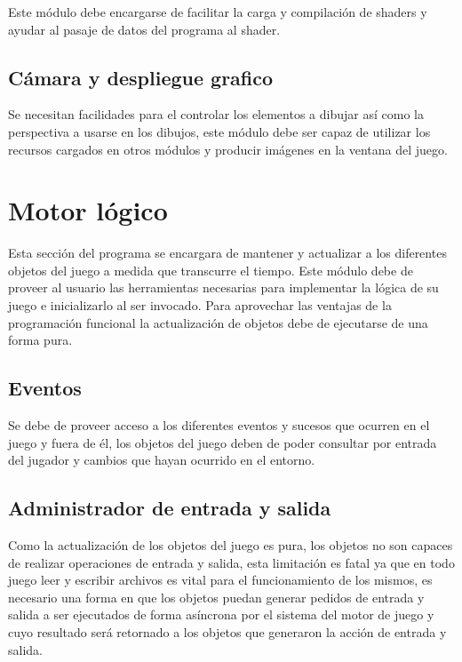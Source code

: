 Este módulo debe encargarse de facilitar la carga y compilación de shaders y ayudar al pasaje de datos del programa al shader.

\subsection{Cámara y despliegue grafico}

Se necesitan facilidades para el controlar los elementos a dibujar así como la perspectiva a usarse en los dibujos, este módulo debe ser capaz de utilizar los recursos cargados en otros módulos y producir imágenes en la ventana del juego.

\section{Motor lógico}

Esta sección del programa se encargara de mantener y actualizar a los diferentes objetos del juego a medida que transcurre el tiempo. Este módulo debe de proveer al usuario las herramientas necesarias para implementar la lógica de su juego e inicializarlo al ser invocado. Para aprovechar las ventajas de la programación funcional la actualización de objetos debe de ejecutarse de una forma pura.

\subsection{Eventos}

Se debe de proveer acceso a los diferentes eventos y sucesos que ocurren en el juego y fuera de él, los objetos del juego deben de poder consultar por entrada del jugador y cambios que hayan ocurrido en el entorno.

\subsection{Administrador de entrada y salida}

Como la actualización de los objetos del juego es pura, los objetos no son capaces de realizar operaciones de entrada y salida, esta limitación es fatal ya que en todo juego leer y escribir archivos es vital para el funcionamiento de los mismos, es necesario una forma en que los objetos puedan generar pedidos de entrada y salida a ser ejecutados de forma asíncrona por el sistema del motor de juego y cuyo resultado será retornado a los objetos que generaron la acción de entrada y salida.

